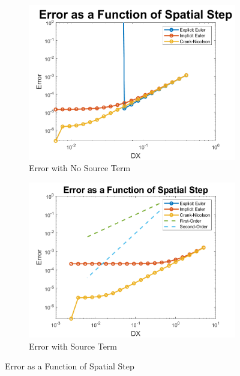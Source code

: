 \documentclass[10pt, letter, showtrims]{extarticle}
\begin{document}
		\FloatBarrier
		\begin{figure}[h]
		\captionsetup{justification=centering}
		\centering
			\begin{subfigure}{.45\textwidth}
				\centering
				\includegraphics[width=\linewidth]{"Figures/MATLAB/ConstantDTNoSource"}
				\caption{Error with No Source Term}
				\label{fig:spatialnosource}
			\end{subfigure}
			\begin{subfigure}{.45\textwidth}
				\centering
				\includegraphics[width=\linewidth]{"Figures/MATLAB/ConstantDTSource"}
				\caption{Error with Source Term}
				\label{fig:spatialsource}
			\end{subfigure}
		\caption{Error as a Function of Spatial Step}
		\label{fig:spatial}
		\end{figure}		
		\FloatBarrier
\end{document}
